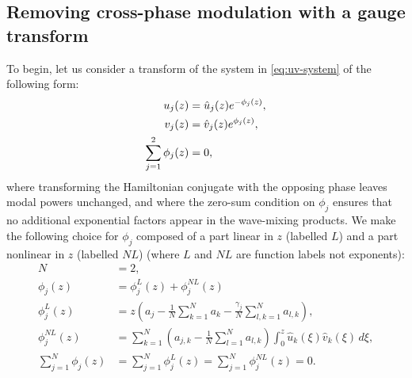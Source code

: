 \documentclass[11pt,a4paper]{article}
\numberwithin{equation}{section}
\begin{document}
\subsection{Removing cross-phase modulation with a gauge transform}

To begin, let us consider a transform of the system in \eqref{eq:uv-system} of the following form:
\begin{align}
u_j(z) &= \hat{u}_j(z) e^{- \phi_j(z)}, \notag \\
v_j(z) &= \hat{v}_j(z) e^{\phi_j(z)}, \\ 
\sum_{j=1}^{2} \phi_j(z) &= 0,
\end{align}
where transforming the Hamiltonian conjugate with the opposing phase leaves modal powers unchanged, and where the zero-sum condition on $\phi_j$ ensures that no additional exponential factors appear in the wave-mixing products.
We make the following choice for $\phi_j$ composed of a part linear in $z$ (labelled $L$) and a part nonlinear in $z$ (labelled $NL$) (where $L$ and $NL$ are function labels not exponents):
\begin{align}
N &= 2, \\
\phi_j(z) &= \phi_j^{L}(z) + \phi_j^{NL}(z) \\
\phi_j^{L}(z) &= z\left({a}_{j} - \frac{1}{N}\sum_{k=1}^{N} a_{k} - \frac{{\gamma}_{j}}{N} \sum\limits_{l,k=1}^{N} a_{l,k}\right), \\
\phi_j^{NL}(z)  &= \sum_{k=1}^{N} \left({a}_{j,k} - \frac{1}{N}\sum_{l=1}^{N} {a}_{l,k}\right) \int_0^z \hat{u}_k (\xi) \hat{v}_k (\xi) \, d\xi, \\
\sum_{j=1}^{N} \phi_j(z) &= \sum_{j=1}^{N} \phi_j^{L}(z) = \sum_{j=1}^{N} \phi_j^{NL}(z) =0.
\end{align}
\end{document}
